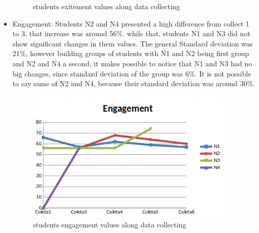 \documentclass[12pt,openright,a4paper]{article}
\begin{document}
\begin{itemize}
\begin{figure}[H]
 	     	\caption{students exitement values along data collecting}
 	     \end{figure}
 	\item Engagement: Students N2 and N4 presented a high difference from collect 1 to 3, that increase was around 56\%. while that, students N1 and N3 did not show significant changes in them values. The general Standard deviation was 21\%, however building groups of students with N1 and N2 being first group and N2 and N4 a second, it makes possible to notice that N1 and N3 had no big changes, since standard deviation of the group was 6\%. It is not possible to say same of N2 and N4, because their standard deviation was around 30\%.       
 	    \begin{figure}[H]
 	   	\centering
 	   	\includegraphics[width=10cm]{./engagement.png}
 	   	\caption{students engagement values along data collecting}
 	   \end{figure}
 \end{itemize}
\end{document}
